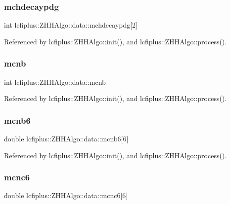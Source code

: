 \subsubsection{mchdecaypdg}
{\footnotesize\ttfamily int lcfiplus\+::\+Z\+H\+H\+Algo\+::data\+::mchdecaypdg[2]}



Referenced by lcfiplus\+::\+Z\+H\+H\+Algo\+::init(), and lcfiplus\+::\+Z\+H\+H\+Algo\+::process().

\mbox{\label{structlcfiplus_1_1ZHHAlgo_1_1data_acee7e664a1ebf847822330d459be962d}} 
\subsubsection{mcnb}
{\footnotesize\ttfamily int lcfiplus\+::\+Z\+H\+H\+Algo\+::data\+::mcnb}



Referenced by lcfiplus\+::\+Z\+H\+H\+Algo\+::init(), and lcfiplus\+::\+Z\+H\+H\+Algo\+::process().

\mbox{\label{structlcfiplus_1_1ZHHAlgo_1_1data_a0b9866aaa4d0b6e67f09c198781292f7}} 
\subsubsection{mcnb6}
{\footnotesize\ttfamily double lcfiplus\+::\+Z\+H\+H\+Algo\+::data\+::mcnb6[6]}



Referenced by lcfiplus\+::\+Z\+H\+H\+Algo\+::init(), and lcfiplus\+::\+Z\+H\+H\+Algo\+::process().

\mbox{\label{structlcfiplus_1_1ZHHAlgo_1_1data_adebb91fadb23c44f372a413907e0ace3}} 
\subsubsection{mcnc6}
{\footnotesize\ttfamily double lcfiplus\+::\+Z\+H\+H\+Algo\+::data\+::mcnc6[6]}



